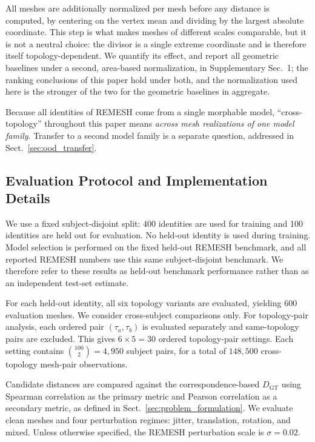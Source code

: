 \documentclass{article}
\begin{document}
All meshes are additionally normalized per mesh before any distance is computed, by
centering on the vertex mean and dividing by the largest absolute coordinate. This step is
what makes meshes of different scales comparable, but it is not a neutral choice: the
divisor is a single extreme coordinate and is therefore itself topology-dependent. We
quantify its effect, and report all geometric baselines under a second, area-based
normalization, in Supplementary Sec.~1; the ranking conclusions of this paper hold under
both, and the normalization used here is the stronger of the two for the geometric
baselines in aggregate.

Because all identities of REMESH come from a single morphable model, ``cross-topology''
throughout this paper means \emph{across mesh realizations of one model family}. Transfer
to a second model family is a separate question, addressed in
Sect.~\ref{sec:ood_transfer}.

\subsection{Evaluation Protocol and Implementation Details}
\label{sec:evaluation_protocol}
We use a fixed subject-disjoint split: 400 identities are used for training and 100 identities are held out for evaluation. No held-out identity is used during training. Model selection is performed on the fixed held-out REMESH benchmark, and all reported REMESH numbers use this same subject-disjoint benchmark. We therefore refer to these results as held-out benchmark performance rather than as an independent test-set estimate.

For each held-out identity, all six topology variants are evaluated, yielding 600 evaluation meshes. We consider cross-subject comparisons only. For topology-pair analysis, each ordered pair $(\tau_a,\tau_b)$ is evaluated separately and same-topology pairs are excluded. This gives $6\times5=30$ ordered topology-pair settings. Each setting contains $\binom{100}{2}=4{,}950$ subject pairs, for a total of $148{,}500$ cross-topology mesh-pair observations.

Candidate distances are compared against the correspondence-based $D_{\mathrm{GT}}$ using Spearman correlation as the primary metric and Pearson correlation as a secondary metric, as defined in Sect.~\ref{sec:problem_formulation}. We evaluate clean meshes and four perturbation regimes: jitter, translation, rotation, and mixed. Unless otherwise specified, the REMESH perturbation scale is $\sigma=0.02$.
\end{document}
